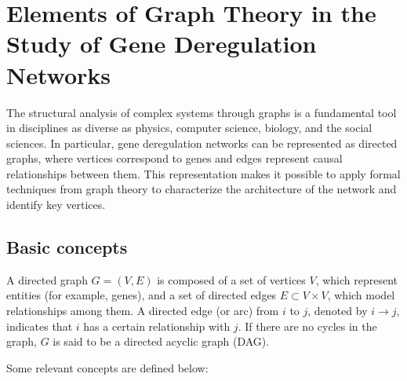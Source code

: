 \documentclass[12pt,a4paper]{report}
\begin{document}
\newpage


\chapter{Elements of Graph Theory in the Study of Gene Deregulation Networks}

The structural analysis of complex systems through graphs is a fundamental tool in disciplines as diverse as physics, computer science, biology, and the social sciences\cite{grafos1}. In particular, gene deregulation networks can be represented as directed graphs, where vertices correspond to genes and edges represent causal relationships between them\cite{grafos2}. This representation makes it possible to apply formal techniques from graph theory \cite{grafos3} to characterize the architecture of the network and identify key vertices.

\section{Basic concepts}

A directed graph \( G = (V, E) \) is composed of a set of vertices \( V \), which represent entities (for example, genes), and a set of directed edges \( E \subset V \times V \), which model relationships among them. A directed edge (or arc) from \( i \) to \( j \), denoted by \( i \to j \), indicates that \( i \) has a certain relationship with \( j \). If there are no cycles in the graph, $G$ is said to be a directed acyclic graph (DAG).

Some relevant concepts are defined below:
\end{document}
